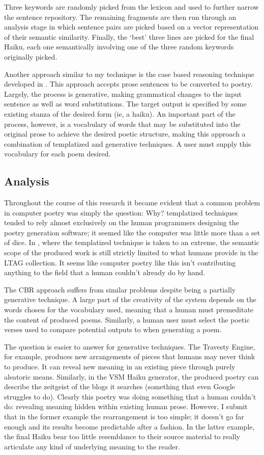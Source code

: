 \documentclass[10pt]{article}
\begin{document}
Three keywords are randomly picked from the lexicon and used to further narrow
the sentence repository. The remaining fragments are then run through an
analysis stage in which sentence pairs are picked based on a vector
representation of their semantic similarity. Finally, the `best' three lines
are picked for the final Haiku, each one semantically involving one of the
three random keywords originally picked.

Another approach similar to my technique is the case based reasoning technique
developed in \cite{Gervas01}. This approach accepts prose sentences to be
converted to poetry. Largely, the process is generative, making grammatical
changes to the input sentence as well as word substitutions. The target output
is specified by some existing stanza of the desired form (ie, a haiku). An
important part of the process, however, is a vocabulary of words that may be
substituted into the original prose to achieve the desired poetic structure,
making this approach a combination of templatized and generative techniques. A
user must supply this vocabulary for each poem desired.

\subsection{Analysis}
Throughout the course of this research it became evident that a common problem in
computer poetry was simply the question: Why? templatized techniques tended to
rely almost exclusively on the human programmers designing the poetry
generation software; it seemed like the computer was little more than a set of
dice. In \cite{Manurung03}, where the templatized technique is taken to an
extreme, the semantic scope of the produced work is still strictly limited to
what humans provide in the LTAG collection. It seems like computer poetry like
this isn't contributing anything to the field that a human couldn't already do
by hand.

The CBR approach suffers from similar problems despite being a partially generative technique.
A large part of the creativity of the system depends on the words chosen for
the vocabulary used, meaning that a human must premeditate the content of
produced poems. Similarly, a human user must select the poetic verses used to
compare potential outputs to when generating a poem.

The question is easier to answer for generative techniques. The Travesty
Engine, for example, produces new arrangements of pieces that humans may never
think to produce. It can reveal new meaning in an existing piece through purely
aleatoric means. Similarly, in the VSM Haiku generator, the produced poetry can
describe the zeitgeist of the blogs it searches (something that even Google
struggles to do). Clearly this poetry was doing something that a human couldn't
do: revealing meaning hidden within existing human prose. However, I submit
that in the former example the rearrangement is too simple; it doesn't go far
enough and its results become predictable after a fashion. In the latter
example, the final Haiku bear too little resemblance to their source material
to really articulate any kind of underlying meaning to the reader.
\end{document}
